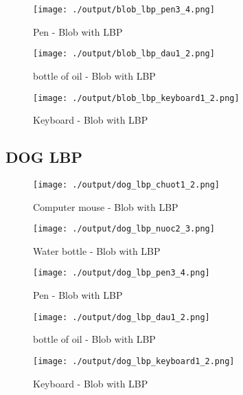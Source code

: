 \documentclass[a4paper, 12pt]{article}
\begin{document}
\begin{figure}[H]
	\centering
	\texttt{[image: ./output/blob\_lbp\_pen3\_4.png]}
	\caption[]{Pen - Blob with LBP }
\end{figure}

\begin{figure}[H]
	\centering
	\texttt{[image: ./output/blob\_lbp\_dau1\_2.png]}
	\caption[]{bottle of oil - Blob with LBP }
\end{figure}

\begin{figure}[H]
	\centering
	\texttt{[image: ./output/blob\_lbp\_keyboard1\_2.png]}
	\caption[]{Keyboard - Blob with LBP }
\end{figure}

\subsection{DOG LBP}
\begin{figure}[H]
	\centering
	\texttt{[image: ./output/dog\_lbp\_chuot1\_2.png]}
	\caption[]{Computer mouse - Blob with LBP }
	\label{fig:harris_sift_chuot2_3.png}
\end{figure}
\begin{figure}[H]
	\centering
	\texttt{[image: ./output/dog\_lbp\_nuoc2\_3.png]}
	\caption[]{Water bottle - Blob with LBP }
	\label{fig:harris_sift_nuoc2_3.png}
\end{figure}

\begin{figure}[H]
	\centering
	\texttt{[image: ./output/dog\_lbp\_pen3\_4.png]}
	\caption[]{Pen - Blob with LBP }
\end{figure}

\begin{figure}[H]
	\centering
	\texttt{[image: ./output/dog\_lbp\_dau1\_2.png]}
	\caption[]{bottle of oil - Blob with LBP }
\end{figure}

\begin{figure}[H]
	\centering
	\texttt{[image: ./output/dog\_lbp\_keyboard1\_2.png]}
	\caption[]{Keyboard - Blob with LBP }
\end{figure}
\end{document}
